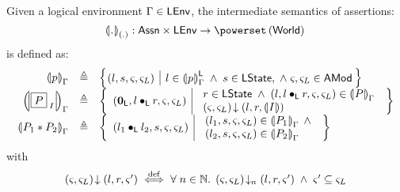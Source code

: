 %
%
\begin{definition}
Given a logical environment $\Gamma \in \textsf{LEnv}$, the intermediate semantics of assertions: 
%
\[
	\intermediateSem[\blankArg]{.}  :  \Assertions \times \LEnv \rightarrow \pset{\Worlds}\\
\]
%
is defined as: 
%
\[
\begin{array}{r c l}
	\intermediateSem{p} & \eqdef & 
	\left\{
	\hspace*{-0.15cm}
	\begin{array}{l | l}
	 \left( l, s, \amod{}, \amod{L} \right) &
	 		l \in \semL{p} \;\land\; s \in \LState,\;\land\; \amod{}, \amod{L} \in \AMods 
	\end{array}
	\hspace*{-0.1cm}
	\right\}\\
	
	
	\intermediateSem{\shared{P}{I}} & \eqdef & 
	\left\{ 
	\begin{array}{l | l}
		(\unitL, l \composeL r, \amod{}, \amod{L}) & 
		\begin{array}{l}
			r \in \LState \;\land\; (l, l \composeL r, \amod{}, \amod{L}) \in \intermediateSem{P} \\
			\extendsAM{\amod{}, \amod{L}}{l}{r}{\intermediateSemI{I} }
	
		\end{array}
	\end{array} \right\}\\
	
	
	\intermediateSem{P_1 * P_2} & \eqdef & 
	\left\{ 
	\begin{array}{l | l}
		(l_1 \composeL l_2, s, \amod{}, \amod{L})& 
		\begin{array}{l}
				 (l_1, s, \amod{}, \amod{L}) \in \intermediateSem{P_1} \;\land\\
				 (l_2, s, \amod{}, \amod{L}) \in \intermediateSem{P_2} 
		\end{array}
	\end{array} 
	\right\}
\end{array}
\]
%
with
%
\[
\begin{array}{l}
	\left(\varsigma_{}, \varsigma_{L}\right) \!\downarrow \left(l, r, \varsigma_{}'\right) \stackrel{\mathrm{def}}{\iff} \forall\; n \in \mathbb{N}.\; \left(\varsigma_{}, \varsigma_{L}\right) \!\downarrow_{n} \left(l, r, \varsigma_{}'\right)  \;\land\; \varsigma_{}' \subseteq \varsigma_{L}\\\\ 
	

\end{array}\]
\end{definition}
